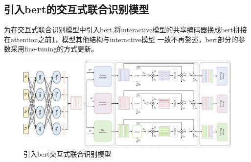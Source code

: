 \subsection{引入bert的交互式联合识别模型}

为在交互式联合识别模型中引入bert,将interactive模型的共享编码器换成bert拼接在attention之前\ref{fig:bert-joint}，模型其他结构与interactive模型
一致不再赘述，bert部分的参数采用fine-tuning的方式更新。
\begin{figure}[htbp]
  \centering
  \includegraphics[width=16cm]{./images/bert-joint.jpg}
  \caption{引入bert交互式联合识别模型}
  \label{fig:bert-joint}
\end{figure}



